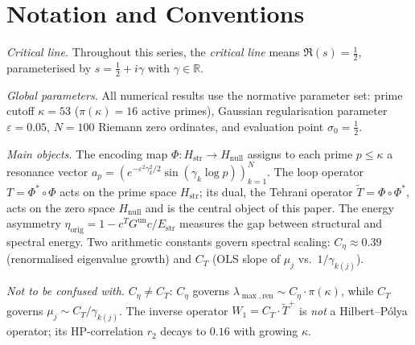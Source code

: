 \documentclass[11pt]{article}
\newcommand{\Hstr}{H_{\mathrm{str}}}
\newcommand{\Hnull}{H_{\mathrm{null}}}
\newcommand{\Estr}{E_{\mathrm{str}}}
\newcommand{\etaorig}{\eta_{\mathrm{orig}}}
\newcommand{\Gun}{G^{\mathrm{un}}}
\newcommand{\Tt}{\widetilde{T}}
\newcommand{\Ceta}{C_{\eta}}
\newcommand{\CT}{C_{T}}
\begin{document}
\begin{abstract}
\textbf{What remains open.}
The analytic proof of $\etaorig > 0$ without the above assumption
(\S\,6); whether a circularity-free spectral function
$f(\Tt)$ exists with spectrum converging to $\{\gamma_k\}$
(\S\,6); and the arithmetic origin of
$\Ceta \approx 0.39$ (\S\,6).

\textbf{Structure.}
The formal core in \S\S\,2--5 is non-circular and proof-complete.
Section~6 states the open problems.
(clearly marked, not used in proofs).
No use of the Riemann Hypothesis, the GUE conjecture, the Montgomery
pair correlation conjecture, or the Hilbert--P\'olya postulate is made
anywhere in \S\S\,2--5.
\end{abstract}

\vspace{2em}

\section*{Notation and Conventions}
\label{sec:notation}

\emph{Critical line.}
Throughout this series, the \emph{critical line} means
$\Re(s)=\tfrac12$, parameterised by $s=\tfrac12+i\gamma$
with $\gamma\in\mathbb{R}$.

\medskip
\emph{Global parameters.}
All numerical results use the normative parameter set:
prime cutoff $\kappa=53$ ($\pi(\kappa)=16$ active primes),
Gaussian regularisation parameter $\varepsilon=0.05$,
$N=100$ Riemann zero ordinates, and evaluation point
$\sigma_0=\tfrac12$.

\medskip
\emph{Main objects.}
The encoding map $\Phi\colon\Hstr\to\Hnull$
assigns to each prime $p\leq\kappa$ a resonance vector
$a_p=(e^{-\varepsilon^2\gamma_k^2/2}\sin(\gamma_k\log p))_{k=1}^N$.
The loop operator $T=\Phi^*\!\circ\Phi$ acts on the prime
space $\Hstr$; its dual, the Tehrani operator
$\Tt=\Phi\circ\Phi^*$, acts on the zero space $\Hnull$
and is the central object of this paper.
The energy asymmetry $\etaorig=1-c^T\Gun c/\Estr$ measures
the gap between structural and spectral energy.
Two arithmetic constants govern spectral scaling:
$\Ceta\approx 0.39$ (renormalised eigenvalue growth) and
$\CT$ (OLS slope of $\mu_j$ vs.\ $1/\gamma_{k(j)}$).

\medskip
\emph{Not to be confused with.}
$\Ceta\neq\CT$: $\Ceta$ governs
$\lambda_{\max,\mathrm{ren}}\sim\Ceta\cdot\pi(\kappa)$,
while $\CT$ governs $\mu_j\sim\CT/\gamma_{k(j)}$.
The inverse operator $W_1=\CT\cdot\Tt^+$ is \emph{not}
a Hilbert--P\'olya operator; its HP-correlation $r_2$
decays to $0.16$ with growing $\kappa$.
\end{document}
